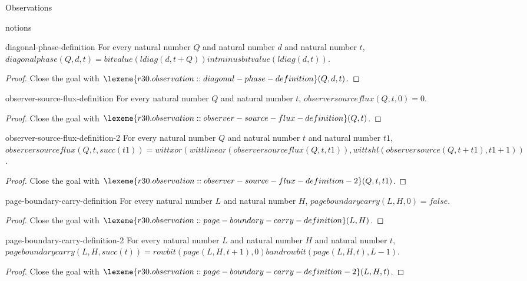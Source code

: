 \begin{lexlean}{Observations}
\begin{section}{notions}
\begin{lemma}{diagonal-phase-definition}
For every natural number \(Q\) and natural number \(d\) and natural number \(t\), \(diagonalphase(Q, d, t) = bitvalue(ldiag(d, t + Q)) intminus bitvalue(ldiag(d, t))\).
\begin{proof}
Close the goal with \(\lexeme{r30.observation::diagonal-phase-definition}(Q, d, t)\).
\end{proof}
\end{lemma}

\begin{lemma}{observer-source-flux-definition}
For every natural number \(Q\) and natural number \(t\), \(observersourceflux(Q, t, 0) = 0\).
\begin{proof}
Close the goal with \(\lexeme{r30.observation::observer-source-flux-definition}(Q, t)\).
\end{proof}
\end{lemma}

\begin{lemma}{observer-source-flux-definition-2}
For every natural number \(Q\) and natural number \(t\) and natural number \(t1\), \(observersourceflux(Q, t, succ(t1)) = wittxor(wittlinear(observersourceflux(Q, t, t1)), wittshl(observersource(Q, t + t1), t1 + 1))\).
\begin{proof}
Close the goal with \(\lexeme{r30.observation::observer-source-flux-definition-2}(Q, t, t1)\).
\end{proof}
\end{lemma}

\begin{lemma}{page-boundary-carry-definition}
For every natural number \(L\) and natural number \(H\), \(pageboundarycarry(L, H, 0) = false\).
\begin{proof}
Close the goal with \(\lexeme{r30.observation::page-boundary-carry-definition}(L, H)\).
\end{proof}
\end{lemma}

\begin{lemma}{page-boundary-carry-definition-2}
For every natural number \(L\) and natural number \(H\) and natural number \(t\), \(pageboundarycarry(L, H, succ(t)) = rowbit(page(L, H, t + 1), 0) band rowbit(page(L, H, t), L - 1)\).
\begin{proof}
Close the goal with \(\lexeme{r30.observation::page-boundary-carry-definition-2}(L, H, t)\).
\end{proof}
\end{lemma}


\end{section}
\end{lexlean}
